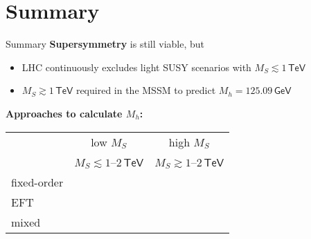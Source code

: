 \documentclass[hyperref={pdfpagelabels=false},ngerman]{beamer}
\newcommand{\cmark}{\ding{51}}%
\newcommand{\xmark}{\ding{55}}%
\newcommand{\eh}[1]{\,\mathsf{#1}}
\newcommand{\ok}{\textcolor{darkgreen}{\cmark}}
\newcommand{\notok}{\textcolor{red}{\xmark}}
\newcommand{\MS}{\ensuremath{M_S}}
\renewcommand{\emph}{\textbf}
\newcommand{\GeV}{\eh{GeV}}
\newcommand{\TeV}{\eh{TeV}}
\begin{document}

\section{Summary}

\begin{frame}{Summary}
  \emph{Supersymmetry} is still viable, but
  \begin{itemize}
  \item LHC continuously excludes light SUSY scenarios with
    $\MS \lesssim 1\TeV$
  \item $\MS \gtrsim 1\TeV$ required in the MSSM to predict
    $M_h = 125.09\GeV$
  \end{itemize}
  \vspace{1em}
  \emph{Approaches to calculate $M_h$:}
  \begin{center}
    \begin{tabular}{lcc}
      \toprule
                               & low $\MS$ & high $\MS$ \\
                               & $\MS \lesssim 1$--$2\eh{TeV}$ & $\MS \gtrsim 1$--$2\eh{TeV}$ \\
      \midrule
      fixed-order              & \ok       & \notok     \\
      EFT                      & \notok    & \ok        \\
      mixed                    & \ok       & \ok        \\
      \bottomrule
    \end{tabular}
  \end{center}
\end{frame}

\end{document}
